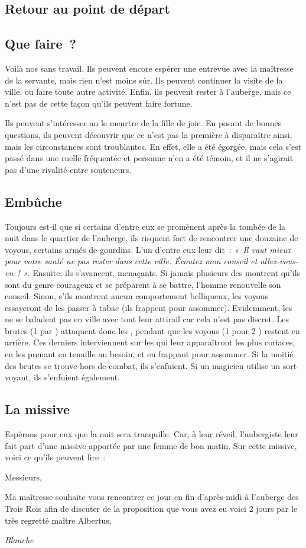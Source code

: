 \documentclass[a4paper,10pt,openany]{book}
\begin{document}
\begin{multicols}{2}
\section{Retour au point de départ}
\subsection{Que faire ?}
Voilà nos \PJs sans travail. Ils peuvent encore espérer une entrevue avec la maîtresse de la servante, mais rien n’est moins sûr. Ils peuvent
continuer la visite de la ville, ou faire toute autre activité. Enfin, ils peuvent rester à l’auberge, mais ce n’est pas de cette façon qu’ils peuvent
faire fortune.\par Ils peuvent s’intéresser au le meurtre de la fille de joie. En posant de bonnes questions, ils peuvent découvrir que ce n’est pas
la première à disparaître ainsi, mais les circonstances sont troublantes. En effet, elle a été égorgée, mais cela s’est passé dans une ruelle
fréquentée et personne n’en a été témoin, et il ne s’agirait pas d’une rivalité entre souteneurs.
\subsection{Embûche}
Toujours est-il que si certains d’entre eux se promènent après la tombée de la nuit dans le quartier de l’auberge, ils risquent fort de rencontrer une
douzaine de voyous, certains armés de gourdins. L’un d’entre eux leur dit : \emph{« Il vaut mieux pour votre santé ne pas rester dans cette ville. Écoutez
mon conseil et allez-vous-en ! »}. Ensuite, ils s’avancent, menaçants. Si jamais plusieurs des \PJs montrent qu’ils sont du genre courageux et
se préparent à se battre, l’homme renouvelle son conseil. Sinon, s’ils montrent aucun comportement belliqueux, les voyous essayeront de les passer à
tabac (ils frappent pour assommer). Evidemment, les \PJs ne se baladent pas en ville avec tout leur attirail car cela n’est pas discret. Les brutes
(1 par \PJ) attaquent donc les \PJs, pendant que les voyous (1 pour 2 \PJs) restent en arrière. Ces derniers interviennent sur les \PJs qui leur
apparaîtront les plus coriaces, en les prenant en tenaille au besoin, et en frappant pour assommer. Si la moitié des brutes se trouve hors de combat,
ils s’enfuient. Si un \PJ magicien utilise un sort voyant, ils s’enfuient également.
\subsection{La missive}
Espérons pour eux que la nuit sera tranquille. Car, à leur réveil, l’aubergiste leur fait part d’une missive apportée par une femme de bon matin. Sur
cette missive, voici ce qu’ils peuvent lire :
\begin{quotebox}
	Messieurs,\par\medskip
	Ma maîtresse souhaite vous rencontrer ce jour en fin d’après-midi à l’auberge des Trois Rois afin de discuter de la proposition que vous avez eu voici
	2 jours par le très regretté maître Albertus.\par\medskip
	\emph{Blanche}
\end{quotebox}

\end{multicols}
\end{document}
